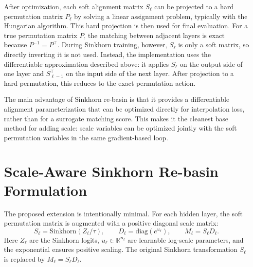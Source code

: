 \documentclass[11pt,a4paper]{report}
\begin{document}
After optimization, each soft alignment matrix \(S_\ell\) can be projected to a hard permutation matrix \(P_\ell\) by solving a linear assignment problem, typically with the Hungarian algorithm. This hard projection is then used for final evaluation. For a true permutation matrix \(P\), the matching between adjacent layers is exact because \(P^{-1}=P^\top\). During Sinkhorn training, however, \(S_\ell\) is only a soft matrix, so directly inverting it is not used. Instead, the implementation uses the differentiable approximation described above: it applies \(S_\ell\) on the output side of one layer and \(S_{\ell-1}^{\top}\) on the input side of the next layer. After projection to a hard permutation, this reduces to the exact permutation action.

The main advantage of Sinkhorn re-basin is that it provides a differentiable alignment parameterization that can be optimized directly for interpolation loss, rather than for a surrogate matching score. This makes it the cleanest base method for adding scale: scale variables can be optimized jointly with the soft permutation variables in the same gradient-based loop.

\section{Scale-Aware Sinkhorn Re-basin Formulation}
\label{sec:scale_aware_sinkhorn}

The proposed extension is intentionally minimal. For each hidden layer, the soft permutation matrix is augmented with a positive diagonal scale matrix:
\[
S_\ell=\mathrm{Sinkhorn}(Z_\ell/\tau),
\qquad
D_\ell=\mathrm{diag}(e^{u_\ell}),
\qquad
M_\ell=S_\ell D_\ell.
\]
Here \(Z_\ell\) are the Sinkhorn logits, \(u_\ell\in\mathbb{R}^{n_\ell}\) are learnable log-scale parameters, and the exponential ensures positive scaling. The original Sinkhorn transformation \(S_\ell\) is replaced by \(M_\ell=S_\ell D_\ell\).
\end{document}
